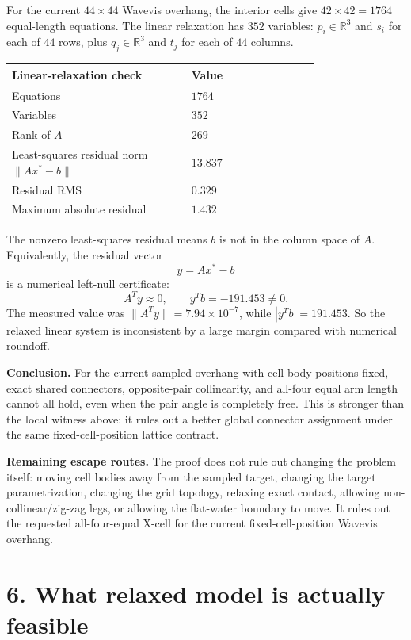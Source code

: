 \documentclass[11pt,letterpaper]{article}
\begin{document}
For the current \(44\times44\) Wavevis overhang, the interior cells give \(42\times42=1764\) equal-length equations. The linear relaxation has \(352\) variables: \(p_i\in\mathbb{R}^3\) and \(s_i\) for each of \(44\) rows, plus \(q_j\in\mathbb{R}^3\) and \(t_j\) for each of \(44\) columns.

\begin{center}
\begin{tabular}{Y{0.45\linewidth}Y{0.32\linewidth}}
\toprule
Linear-relaxation check & Value \\
\midrule
Equations & \(1764\) \\
Variables & \(352\) \\
Rank of \(A\) & \(269\) \\
Least-squares residual norm \(\|Ax^\ast-b\|\) & \(13.837\) \\
Residual RMS & \(0.329\) \\
Maximum absolute residual & \(1.432\) \\
\bottomrule
\end{tabular}
\end{center}

The nonzero least-squares residual means \(b\) is not in the column space of \(A\). Equivalently, the residual vector
\[
y=Ax^\ast-b
\]
is a numerical left-null certificate:
\[
A^Ty\approx 0,\qquad y^Tb=-191.453\neq 0.
\tag{13}
\]
The measured value was \(\|A^Ty\|=7.94\times10^{-7}\), while \(|y^Tb|=191.453\). So the relaxed linear system is inconsistent by a large margin compared with numerical roundoff.

\textbf{Conclusion.} For the current sampled overhang with cell-body positions fixed, exact shared connectors, opposite-pair collinearity, and all-four equal arm length cannot all hold, even when the pair angle is completely free. This is stronger than the local witness above: it rules out a better global connector assignment under the same fixed-cell-position lattice contract.

\textbf{Remaining escape routes.} The proof does not rule out changing the problem itself: moving cell bodies away from the sampled target, changing the target parametrization, changing the grid topology, relaxing exact contact, allowing non-collinear/zig-zag legs, or allowing the flat-water boundary to move. It rules out the requested all-four-equal X-cell for the current fixed-cell-position Wavevis overhang.

\section*{6. What relaxed model is actually feasible}
\end{document}
